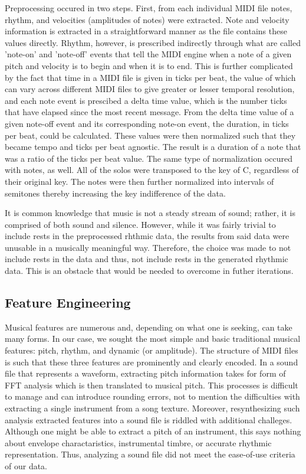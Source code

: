 \documentclass[conference]{IEEEtran}
\begin{document}
Preprocessing occured in two steps. First, from each individual MIDI file notes, rhythm, and velocities (amplitudes of notes) were extracted. Note and velocity information is extracted in a straightforward manner as the file contains these values directly. Rhythm, however, is prescribed indirectly through what are called 'note-on' and 'note-off' events that tell the MIDI engine when a note of a given pitch and velocity is to begin and when it is to end. This is further complicated by the fact that time in a MIDI file is given in ticks per beat, the value of which can vary across different MIDI files to give greater or lesser temporal resolution, and each note event is prescibed a delta time value, which is the number ticks that have elapsed since the most recent message. From the delta time value of a given note-off event and its corresponding note-on event, the duration, in ticks per beat, could be calculated. These values were then normalized such that they became tempo and ticks per beat agnostic. The result is a duration of a note that was a ratio of the ticks per beat value. The same type of normalization occured with notes, as well. All of the solos were transposed to the key of C, regardless of their original key. The notes were then further normalized into intervals of semitones thereby increasing the key indifference of the data.

It is common knowledge that music is not a steady stream of sound; rather, it is comprised of both sound and silence. However, while it was fairly trivial to include rests in the preprocessed rhthmic data, the results from said data were unusable in a musically meaningful way. Therefore, the choice was made to not include rests in the data and thus, not include rests in the generated rhythmic data. This is an obstacle that would be needed to overcome in futher iterations.

\subsection{Feature Engineering} \label{Feature Engineering}
Musical features are numerous and, depending on what one is seeking, can take many forms. In our case, we sought the most simple and basic traditional musical features: pitch, rhythm, and dynamic (or amplitude). The structure of MIDI files is such that these three features are prominently and clearly encoded. In a sound file that represents a waveform, extracting pitch information takes for form of FFT analysis which is then translated to musical pitch. This processes is difficult to manage and can introduce rounding errors, not to mention the difficulties with extracting a single instrument from a song texture. Moreover, resynthesizing such analysis extracted features into a sound file is riddled with additional challeges. Although one might be able to extract a pitch of an instrument, this says nothing about envelope charactaristics, instrumental timbre, or accurate rhythmic representation. Thus, analyzing a sound file did not meet the ease-of-use criteria of our data.
\end{document}
